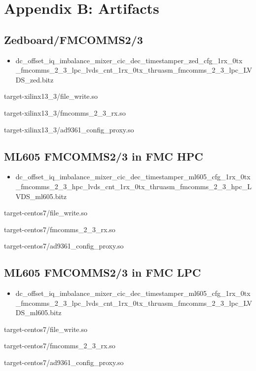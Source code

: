 \section{Appendix B: Artifacts}
\subsection{Zedboard/FMCOMMS2/3}
	\begin{itemize}
	\item dc\_offset\_iq\_imbalance\_mixer\_cic\_dec\_timestamper\_zed\_cfg\_1rx\_0tx \\
\_fmcomms\_2\_3\_lpc\_lvds\_cnt\_1rx\_0tx\_thruasm\_fmcomms\_2\_3\_lpc\_LVDS\_zed.bitz
	\end{itemize}
	\begin{itemize}
	\begin{minipage}[t]{.5\textwidth}
	\item target-xilinx13\_3/file\_write.so
	\item target-xilinx13\_3/fmcomms\_2\_3\_rx.so
	\item target-xilinx13\_3/ad9361\_config\_proxy.so
	\end{minipage}
	\end{itemize}
\subsection{ML605 FMCOMMS2/3 in FMC HPC}
	\begin{itemize}
	\item dc\_offset\_iq\_imbalance\_mixer\_cic\_dec\_timestamper\_ml605\_cfg\_1rx\_0tx \\
\_fmcomms\_2\_3\_hpc\_lvds\_cnt\_1rx\_0tx\_thruasm\_fmcomms\_2\_3\_hpc\_LVDS\_ml605.bitz
	\end{itemize}
	\begin{itemize}
	\begin{minipage}[t]{.5\textwidth}
	\item target-centos7/file\_write.so
	\item target-centos7/fmcomms\_2\_3\_rx.so
	\item target-centos7/ad9361\_config\_proxy.so
	\end{minipage}
	\end{itemize}
\subsection{ML605 FMCOMMS2/3 in FMC LPC}
	\begin{itemize}
	\item dc\_offset\_iq\_imbalance\_mixer\_cic\_dec\_timestamper\_ml605\_cfg\_1rx\_0tx \\
\_fmcomms\_2\_3\_lpc\_lvds\_cnt\_1rx\_0tx\_thruasm\_fmcomms\_2\_3\_lpc\_LVDS\_ml605.bitz
	\end{itemize}
	\begin{itemize}
	\begin{minipage}[t]{.5\textwidth}
	\item target-centos7/file\_write.so
	\item target-centos7/fmcomms\_2\_3\_rx.so
	\item target-centos7/ad9361\_config\_proxy.so
	\end{minipage}
	\end{itemize}
